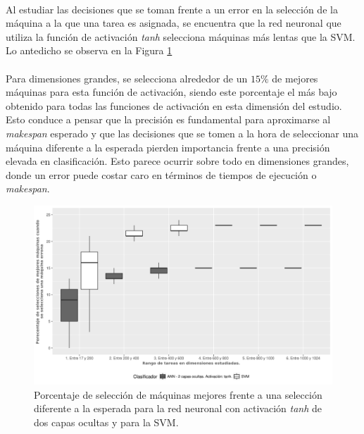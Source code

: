\paragraph{} Al estudiar las decisiones que se toman frente a un error en la selección de la máquina a la que una tarea es asignada, se encuentra que la red neuronal que utiliza la función de activación \textit{tanh} selecciona máquinas más lentas que la SVM. Lo antedicho se observa en la Figura \ref{fig:tanh_mejores} 

\paragraph{} Para dimensiones grandes, se selecciona alrededor de un $15\%$ de mejores máquinas para esta función de activación, siendo este porcentaje el más bajo obtenido para todas las funciones de activación en esta dimensión del estudio. Esto conduce a pensar que la precisión es fundamental para aproximarse al \textit{makespan} esperado y que las decisiones que se tomen a la hora de seleccionar una máquina diferente a la esperada pierden importancia frente a una precisión elevada en clasificación. Esto parece ocurrir sobre todo en dimensiones grandes, donde un error puede costar caro en términos de tiempos de ejecución o \textit{makespan}.

\begin{figure}[H]
  \centering
  \includegraphics[width=\columnwidth]{imagenes/tanh/4_porcentaje_maquinas_mejores_ann_2_capas_ocultas_tanh.png}
  \caption{Porcentaje de selección de máquinas mejores frente a una selección diferente a la esperada para la red neuronal con activación \textit{tanh} de dos capas ocultas y para la SVM.}
  \label{fig:tanh_mejores}
\end{figure}

